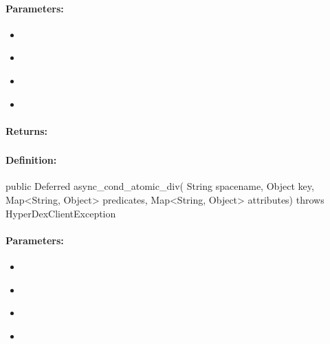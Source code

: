 \paragraph{Parameters:}
\begin{itemize}[noitemsep]
\item {}\\

\item {}\\

\item {}\\

\item {}\\

\end{itemize}

\paragraph{Returns:}


\pagebreak
\subsubsection{}
\label{api:java:async_cond_atomic_div}


\paragraph{Definition:}
\begin{javacode}
public Deferred async_cond_atomic_div(
        String spacename,
        Object key,
        Map<String, Object> predicates,
        Map<String, Object> attributes) throws HyperDexClientException
\end{javacode}

\paragraph{Parameters:}
\begin{itemize}[noitemsep]
\item {}\\

\item {}\\

\item {}\\

\item {}\\

\end{itemize}


